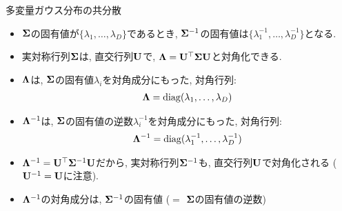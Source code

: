 \documentclass[dvipdfmx,notheorems,t]{beamer}
\begin{document}
\begin{frame}{多変量ガウス分布の共分散}
\begin{itemize}
  \item $\vb{\Sigma}$の固有値が$\{ \lambda_1, \ldots, \lambda_D \}$であるとき,
  $\vb{\Sigma}^{-1}$の固有値は$\{ \lambda_1^{-1}, \ldots, \lambda_D^{-1} \}$となる.
  \item 実対称行列$\vb{\Sigma}$は, 直交行列$\vb{U}$で, $\vb{\Lambda} = \vb{U}^\top \vb{\Sigma} \vb{U}$と対角化できる.
  \item $\vb{\Lambda}$は, $\vb{\Sigma}$の固有値$\lambda_i$を対角成分にもった, 対角行列:
  \begin{align*}
    \vb{\Lambda} = \operatorname{diag}(\lambda_1, \ldots, \lambda_D)
  \end{align*}
  \item $\vb{\Lambda}^{-1}$は, $\vb{\Sigma}$の固有値の逆数$\lambda_i^{-1}$を対角成分にもった, 対角行列:
  \begin{align*}
    \vb{\Lambda}^{-1} = \operatorname{diag}(\lambda_1^{-1}, \ldots, \lambda_D^{-1})
  \end{align*}
  \item $\vb{\Lambda}^{-1} = \vb{U}^\top \vb{\Sigma}^{-1} \vb{U}$だから,
  実対称行列$\vb{\Sigma}^{-1}$も, 直交行列$\vb{U}$で対角化される ($\vb{U}^{-1} = \vb{U}$に注意).
  \item $\vb{\Lambda}^{-1}$の対角成分は, $\vb{\Sigma}^{-1}$の固有値 ($=$ $\vb{\Sigma}$の固有値の逆数)
\end{itemize}
\end{frame}
\end{document}
